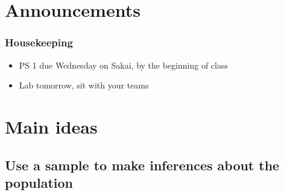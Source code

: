 \documentclass[11pt,containsverbatim,handout,xcolor=xelatex,dvipsnames,table]{beamer}
\begin{document}

\section{Announcements}


\begin{frame}
\frametitle{Housekeeping}

\begin{itemize}

\item PS 1 due Wednesday on Sakai, by the beginning of class

\item Lab tomorrow, sit with your teams

\end{itemize}

\end{frame}


\section{Main ideas}


\subsection{Use a sample to make inferences about the population}
\label{mi1}

\end{document}

